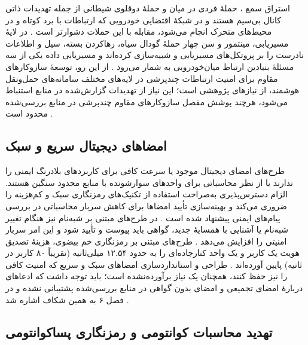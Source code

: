 \documentclass[12pt,a4paper]{article}
\begin{document}
استراق سمع ، حملهٔ فردی در میان  و حملهٔ دوقلوی شیطانی  از جمله تهدیدات ذاتی کانال بی‌سیم هستند و در شبکهٔ اقتضایی خودرویی که ارتباطات با برد کوتاه و در محیط‌های متحرک انجام می‌شود، مقابله با این حملات دشوارتر است \cite{farsimadanReviewSecurityChallenges2025}. در لایهٔ مسیریابی، مینتمور و سن چهار حملهٔ گودال سیاه، رهاکردن بسته، سیل و اطلاعات نادرست را بر پروتکل‌های مسیریابی  و  شبیه‌سازی کرده‌اند \cite{VanetSecurityPrivacy} و مسیریابی داده یکی از سه مسئلهٔ بنیادین ارتباط میان‌خودرویی به شمار می‌رود \cite{hozouriOverviewVANETVehicular2023}. از این رو، توسعهٔ سازوکار‌های مقاوم برای امنیت ارتباطات چندپرشی در لایه‌های مختلف سامانه‌های حمل‌ونقل هوشمند، از نیاز‌های پژوهشی است؛ این نیاز از تهدیدات گزارش‌شده در منابع استنباط می‌شود، هرچند پوشش مفصل سازوکار‌های مقاوم چندپرشی در منابع بررسی‌شده محدود است \cite{farsimadanReviewSecurityChallenges2025, VanetSecurityPrivacy}.

\subsection{امضا‌های دیجیتال سریع و سبک}

طرح‌های امضای دیجیتال موجود یا سرعت کافی برای کاربرد‌های بلادرنگ ایمنی را ندارند یا از نظر محاسباتی برای واحد‌های سوارشونده با منابع محدود سنگین هستند. الزام دسترس‌پذیری به‌صراحت استفاده از تکنیک‌های رمزنگاری سبک و کم‌هزینه را ضروری می‌کند \cite{farsimadanReviewSecurityChallenges2025} و بهینه‌سازی تأیید امضا‌ها برای کاهش سربار محاسباتی در بررسی پیام‌های ایمنی پیشنهاد شده است \cite{SecuringVehicularAd}. در طرح‌های مبتنی بر شبه‌نام نیز هنگام تغییر شبه‌نام یا آشنایی با همسایهٔ جدید، گواهی باید پیوست و تأیید شود و این امر سربار امنیتی را افزایش می‌دهد \cite{al-aniPrivacySafetyImprovement2023}. طرح‌های مبتنی بر رمزنگاری خم بیضوی، هزینهٔ تصدیق هویت یک کاربر و یک واحد کنارجاده‌ای را به حدود ۱۲.۵۴ میلی‌ثانیه (تقریباً ۸۰ کاربر در ثانیه) پایین آورده‌اند \cite{mariaBAIVEfficientBlockchainBased2022}. طراحی و استانداردسازی امضا‌های سبک و سریع که امنیت کافی را نیز حفظ کنند، همچنان یک نیاز برآورده‌نشده است؛ باید توجه داشت که ادعا‌های دربارهٔ امضای تجمیعی و امضای بدون گواهی در منابع بررسی‌شده پشتیبانی نشده و در فصل ۶ به همین شکاف اشاره شد \cite{farsimadanReviewSecurityChallenges2025, SecuringVehicularAd}.

\subsection{تهدید محاسبات کوانتومی و رمزنگاری پساکوانتومی}
\end{document}
